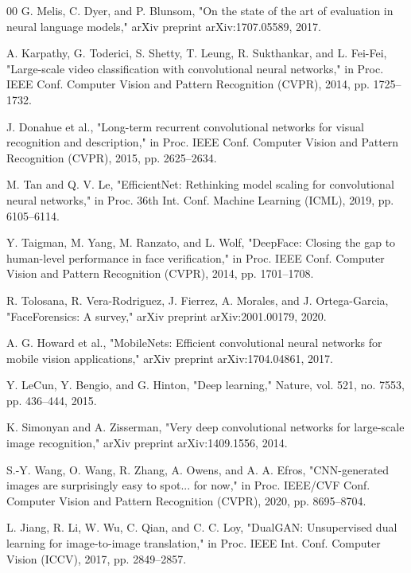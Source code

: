 \documentclass[conference]{IEEEtran}
\begin{document}
\begin{thebibliography}{00}
 G. Melis, C. Dyer, and P. Blunsom, "On the state of the art of evaluation in neural language models," arXiv preprint arXiv:1707.05589, 2017.

 A. Karpathy, G. Toderici, S. Shetty, T. Leung, R. Sukthankar, and L. Fei-Fei, "Large-scale video classification with convolutional neural networks," in Proc. IEEE Conf. Computer Vision and Pattern Recognition (CVPR), 2014, pp. 1725–1732.

 J. Donahue et al., "Long-term recurrent convolutional networks for visual recognition and description," in Proc. IEEE Conf. Computer Vision and Pattern Recognition (CVPR), 2015, pp. 2625–2634.

 M. Tan and Q. V. Le, "EfficientNet: Rethinking model scaling for convolutional neural networks," in Proc. 36th Int. Conf. Machine Learning (ICML), 2019, pp. 6105–6114.

 Y. Taigman, M. Yang, M. Ranzato, and L. Wolf, "DeepFace: Closing the gap to human-level performance in face verification," in Proc. IEEE Conf. Computer Vision and Pattern Recognition (CVPR), 2014, pp. 1701–1708.

 R. Tolosana, R. Vera-Rodriguez, J. Fierrez, A. Morales, and J. Ortega-Garcia, "FaceForensics: A survey," arXiv preprint arXiv:2001.00179, 2020.

 A. G. Howard et al., "MobileNets: Efficient convolutional neural networks for mobile vision applications," arXiv preprint arXiv:1704.04861, 2017.

 Y. LeCun, Y. Bengio, and G. Hinton, "Deep learning," Nature, vol. 521, no. 7553, pp. 436–444, 2015.

 K. Simonyan and A. Zisserman, "Very deep convolutional networks for large-scale image recognition," arXiv preprint arXiv:1409.1556, 2014.

 S.-Y. Wang, O. Wang, R. Zhang, A. Owens, and A. A. Efros, "CNN-generated images are surprisingly easy to spot... for now," in Proc. IEEE/CVF Conf. Computer Vision and Pattern Recognition (CVPR), 2020, pp. 8695–8704.

 L. Jiang, R. Li, W. Wu, C. Qian, and C. C. Loy, "DualGAN: Unsupervised dual learning for image-to-image translation," in Proc. IEEE Int. Conf. Computer Vision (ICCV), 2017, pp. 2849–2857.


\end{thebibliography}
\end{document}
